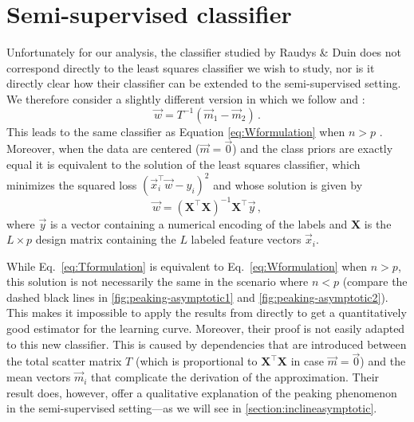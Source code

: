\documentclass[runningheads,a4paper]{llncs}\usepackage[]{graphicx}\usepackage[]{color}
\begin{document}
\section{Semi-supervised classifier} \label{section:semi-supervised}
Unfortunately for our analysis, the classifier studied by Raudys \& Duin does not correspond directly to the least squares classifier we wish to study, nor is it directly clear how their classifier can be extended to the semi-supervised setting.
We therefore consider a slightly different version in which we follow \cite{Duin1995} and \cite{Fan2008}:
\begin{equation}
\vec{w} = T^{-1} (\vec{m}_1-\vec{m}_2) \label{eq:Tformulation} \, .
\end{equation}
This leads to the same classifier as Equation \eqref{eq:Wformulation} when $n>p$ \cite{Duin1995}. Moreover, when the data are centered ($\vec{m}=\vec{0}$) and the class priors are exactly equal it is equivalent to the solution of the least squares classifier, which minimizes the squared loss $(\vec{x}_i^\top \vec{w} - y_i)^2$ and whose solution is given by
\begin{equation}
\vec{w} = (\mathbf{X}^\top \mathbf{X})^{-1} \mathbf{X}^\top \vec{y} \, , \label{eq:solutionsupervised}
\end{equation}
where $\vec{y}$ is a vector containing a numerical encoding of the labels and $\mathbf{X}$ is the $L \times p$ design matrix containing the $L$ labeled feature vectors $\vec{x}_i$.

While Eq.~\eqref{eq:Tformulation} is equivalent to Eq.~\eqref{eq:Wformulation} when $n>p$, this solution is not necessarily the same in the scenario where $n<p$ (compare the dashed black lines in \cref{fig:peaking-asymptotic1} and \cref{fig:peaking-asymptotic2}). This makes it impossible to apply the results from \cite{Raudys1998} directly to get a quantitatively good estimator for the learning curve. Moreover, their proof is not easily adapted to this new classifier. This is caused by dependencies that are introduced between the total scatter matrix $T$ (which is proportional to $\mathbf{X}^\top \mathbf{X}$ in case $\vec{m}=\vec{0}$) and the mean vectors $\vec{m}_i$ that complicate the derivation of the approximation. Their result does, however, offer a qualitative explanation of the peaking phenomenon in the semi-supervised setting---as we will see in \cref{section:inclineasymptotic}.
\end{document}

